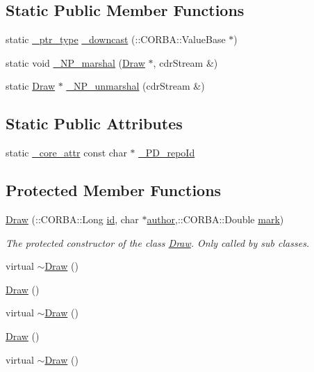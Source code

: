 \subsection*{Static Public Member Functions}
\begin{DoxyCompactItemize}
\item 
static \hyperlink{class_draw_a5164256572b3c4123ceecd1897c248dd}{\+\_\+ptr\+\_\+type} \hyperlink{class_draw_adf5095556588059f6a3c1663e84e46c0}{\+\_\+downcast} (\+::C\+O\+R\+B\+A\+::\+Value\+Base $\ast$)
\item 
static void \hyperlink{class_draw_aa95f9c6dc4ba6f6d3477fc6432180594}{\+\_\+\+N\+P\+\_\+marshal} (\hyperlink{class_draw}{Draw} $\ast$, cdr\+Stream \&)
\item 
static \hyperlink{class_draw}{Draw} $\ast$ \hyperlink{class_draw_a3c3a65725a77c521aca9582928f5b298}{\+\_\+\+N\+P\+\_\+unmarshal} (cdr\+Stream \&)
\end{DoxyCompactItemize}
\subsection*{Static Public Attributes}
\begin{DoxyCompactItemize}
\item 
static \hyperlink{_petit_prince_8hpp_a5f7bf7cddb608c2aad7c95f55f8a33c5}{\+\_\+core\+\_\+attr} const char $\ast$ \hyperlink{class_draw_aa81c5a904a215524ca32f588126783bc}{\+\_\+\+P\+D\+\_\+repo\+Id}
\end{DoxyCompactItemize}
\subsection*{Protected Member Functions}
\begin{DoxyCompactItemize}
\item 
\hyperlink{class_draw_ad7d5df539676d880a1190ce78251b035}{Draw} (\+::C\+O\+R\+B\+A\+::\+Long \hyperlink{class_draw_a1bf27c5a59da9002d55936c947dce2cc}{id}, char $\ast$\hyperlink{class_draw_a4781c654db63e069c8c5be017f6ccc34}{author},\+::C\+O\+R\+B\+A\+::\+Double \hyperlink{class_draw_aeee0f92e6a2835212a7f3e44e4e41227}{mark})
\begin{DoxyCompactList}\small\item\em The protected constructor of the class \hyperlink{class_draw}{Draw}. Only called by sub classes. \end{DoxyCompactList}\item 
virtual \hyperlink{class_draw_a9c2feb77460265c202c60772ae05656a}{$\sim$\+Draw} ()
\item 
\hyperlink{class_draw_a7c808e2194e8659b401584773e26730e}{Draw} ()
\item 
virtual \hyperlink{class_draw_a9c2feb77460265c202c60772ae05656a}{$\sim$\+Draw} ()
\item 
\hyperlink{class_draw_a7c808e2194e8659b401584773e26730e}{Draw} ()
\item 
virtual \hyperlink{class_draw_a9c2feb77460265c202c60772ae05656a}{$\sim$\+Draw} ()
\end{DoxyCompactItemize}


